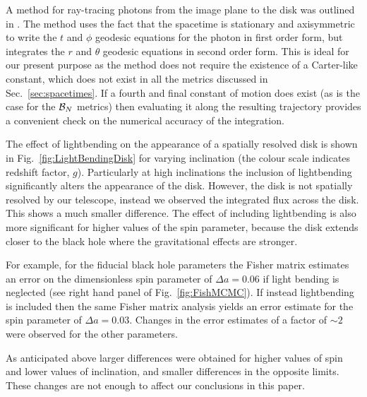 A method for ray-tracing photons from the image plane to the disk was outlined in \cite{2012ApJ...745....1P}. The method uses the fact that the spacetime is stationary and axisymmetric to write the $t$ and $\phi$ geodesic equations for the photon in first order form, but integrates the $r$ and $\theta$ geodesic equations in second order form. This is ideal for our present purpose as the method does not require the existence of a Carter-like constant, which does not exist in all the metrics discussed in Sec.\ \ref{sec:spacetimes}. If a fourth and final constant of motion does exist (as is the case for the ${\cal{B}}_{N}$ metrics) then evaluating it along the resulting trajectory provides a convenient check on the numerical accuracy of the integration. 

The effect of lightbending on the appearance of a spatially resolved disk is shown in Fig.\ \ref{fig:LightBendingDisk} for varying inclination (the colour scale indicates redshift factor, $g$).  Particularly at high inclinations the inclusion of lightbending significantly alters the appearance of the disk. However, the disk is not spatially resolved by our telescope, instead we observed the integrated flux across the disk. This shows a much smaller difference. The effect of including lightbending is also more significant for higher values of the spin parameter, because the disk extends closer to the black hole where the gravitational effects are stronger. 


For example, for the fiducial black hole parameters the Fisher matrix estimates an error on the dimensionless spin parameter of $\Delta a=0.06$ if light bending is neglected (see right hand panel of Fig.\ \ref{fig:FishMCMC}). If instead lightbending is included then the same Fisher matrix analysis yields an error estimate for the spin parameter of $\Delta a=0.03$. Changes in the error estimates of a factor of $\sim 2$ were observed for the other parameters. 

As anticipated above larger differences were obtained for higher values of spin and lower values of inclination, and smaller differences in the opposite limits. These changes are not enough to affect our conclusions in this paper.

